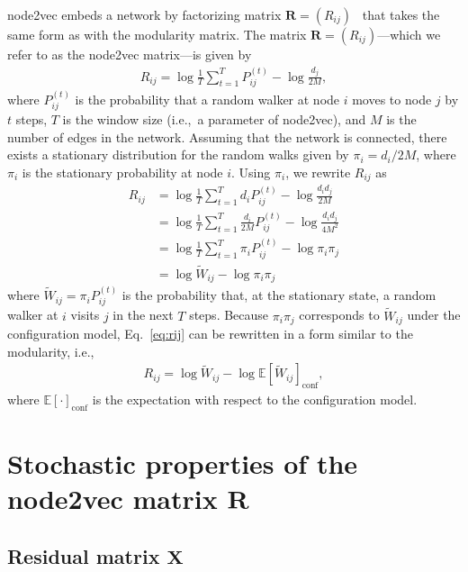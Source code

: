 \documentclass[12pt]{article} %
\def\mat#1{\mathbf{#1}}
\def\Exp{{\mathbb E}}
\def\ie{i.e.,~}
\begin{document}
node2vec embeds a network by factorizing matrix $\mat{R}=(R_{ij})$~\cite{Qiu2018} that takes the same form as with the modularity matrix.
The matrix $\mat{R}=(R_{ij})$---which we refer to as the node2vec matrix---is given by
\begin{align}
    R_{ij} = \log{ \frac{1}{T}\sum_{t=1}^T P^{(t)}_{ij}} - \log \frac{d_j}{2M}, \label{eq:rij}
\end{align}
where $P^{(t)}_{ij}$ is the probability that a random walker at node $i$ moves to node $j$ by $t$ steps, $T$ is the window size (\ie a parameter of node2vec), and
$M$ is the number of edges in the network.
Assuming that the network is connected, there exists a stationary distribution for the random walks given by $\pi_i = d_i / 2M$,
where $\pi_i$ is the stationary probability at node $i$.
Using $\pi_i$, we rewrite $R_{ij}$ as
\begin{align}
    R_{ij} & = \log{ \frac{1}{T}\sum_{t=1}^T d_i P^{(t)}_{ij}} - \log \frac{d_i d_j}{2M}             \\
           & = \log{\frac{1}{T}\sum_{t=1}^T \frac{d_i}{2M} P^{(t)}_{ij}} - \log \frac{d_i d_j}{4M^2} \\
           & = \log{\frac{1}{T}\sum_{t=1}^T \pi_i P^{(t)}_{ij}} - \log \pi_i \pi_j                   \\
           & = \log{\tilde W_{ij}} - \log \pi_i \pi_j
\end{align}
where $\tilde W_{ij} = \pi_i P_{ij} ^{(t)}$ is the probability that, at the stationary state,
a random walker at $i$ visits $j$ in the next $T$ steps.
Because $\pi_i \pi_j$ corresponds to $\tilde W_{ij}$ under the configuration model, Eq.~\eqref{eq:rij} can be rewritten in a form similar to the modularity, \ie
\begin{align}
    \label{eq:modularity}
    R_{ij}  = \log{\tilde W_{ij}} - \log \Exp\left[ \tilde W_{ij} \right]_{\text{conf}},
\end{align}
where $\Exp\left[ \cdot \right]_{\text{conf}}$ is the expectation with respect to the configuration model.

\section{Stochastic properties of the node2vec matrix $\mat{R}$}

\subsection{Residual matrix $\mat{X}$}
\end{document}
